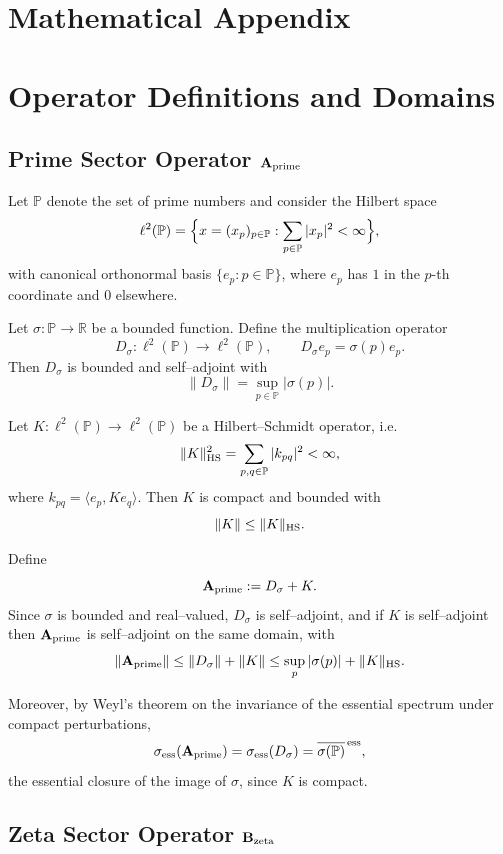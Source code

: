 \documentclass[11pt]{article}
\begin{document}
\appendix
\section*{Mathematical Appendix}

\section{Operator Definitions and Domains}

\subsection{Prime Sector Operator \texorpdfstring{$\mathbf{A}_{\rm prime}$}{A\_prime}}

Let \(\mathbb{P}\) denote the set of prime numbers and consider the Hilbert space
\[
  \ell^2(\mathbb{P})
  = \Bigl\{ x = (x_p)_{p\in\mathbb{P}} : \sum_{p\in\mathbb{P}} |x_p|^2 < \infty \Bigr\},
\]
with canonical orthonormal basis \(\{e_p : p\in\mathbb{P}\}\), where \(e_p\) has \(1\) in the \(p\)-th coordinate and \(0\) elsewhere.

Let \(\sigma:\mathbb{P}\to\mathbb{R}\) be a bounded function. Define the multiplication operator
\[
  D_\sigma : \ell^2(\mathbb{P}) \to \ell^2(\mathbb{P}), \qquad D_\sigma e_p = \sigma(p) e_p.
\]
Then \(D_\sigma\) is bounded and self–adjoint with
\[
  \|D_\sigma\| = \sup_{p\in\mathbb{P}} |\sigma(p)|.
\]

Let \(K:\ell^2(\mathbb{P})\to\ell^2(\mathbb{P})\) be a Hilbert–Schmidt operator, i.e.
\[
  \|K\|_{\rm HS}^2 = \sum_{p,q\in\mathbb{P}} |k_{pq}|^2 < \infty,
\]
where \(k_{pq} = \langle e_p, K e_q \rangle\). Then \(K\) is compact and bounded with
\[
  \|K\| \le \|K\|_{\rm HS}.
\]

Define
\[
  \mathbf{A}_{\rm prime} := D_\sigma + K.
\]
Since \(\sigma\) is bounded and real–valued, \(D_\sigma\) is self–adjoint, and if \(K\) is self–adjoint then \(\mathbf{A}_{\rm prime}\) is self–adjoint on the same domain, with
\[
  \|\mathbf{A}_{\rm prime}\| \le \|D_\sigma\| + \|K\|
  \le \sup_{p}|\sigma(p)| + \|K\|_{\rm HS}.
\]

Moreover, by Weyl’s theorem on the invariance of the essential spectrum under compact perturbations,
\[
  \sigma_{\rm ess}(\mathbf{A}_{\rm prime})
  = \sigma_{\rm ess}(D_\sigma)
  = \overline{\sigma(\mathbb{P})}^{\,\rm ess},
\]
the essential closure of the image of \(\sigma\), since \(K\) is compact.

\subsection{Zeta Sector Operator \texorpdfstring{$\mathbf{B}_{\rm zeta}$}{B\_zeta}}
\end{document}
